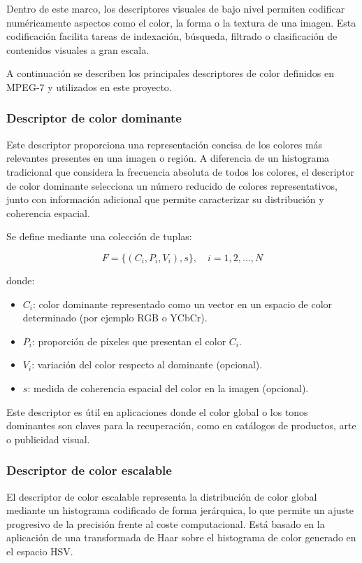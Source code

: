 Dentro de este marco, los descriptores visuales de bajo nivel permiten codificar numéricamente aspectos como el color, la forma o la textura de una imagen. Esta codificación facilita tareas de indexación, búsqueda, filtrado o clasificación de contenidos visuales a gran escala.

A continuación se describen los principales descriptores de color definidos en MPEG-7 y utilizados en este proyecto.

\subsubsection{Descriptor de color dominante}

Este descriptor proporciona una representación concisa de los colores más relevantes presentes en una imagen o región. A diferencia de un histograma tradicional que considera la frecuencia absoluta de todos los colores, el descriptor de color dominante selecciona un número reducido de colores representativos, junto con información adicional que permite caracterizar su distribución y coherencia espacial.

Se define mediante una colección de tuplas:

\[
F = \{ (C_i, P_i, V_i), s \}, \quad i = 1, 2, ..., N
\]

donde:
\begin{itemize}
    \item $C_i$: color dominante representado como un vector en un espacio de color determinado (por ejemplo RGB o YCbCr).
    \item $P_i$: proporción de píxeles que presentan el color $C_i$.
    \item $V_i$: variación del color respecto al dominante (opcional).
    \item $s$: medida de coherencia espacial del color en la imagen (opcional).
\end{itemize}

Este descriptor es útil en aplicaciones donde el color global o los tonos dominantes son claves para la recuperación, como en catálogos de productos, arte o publicidad visual.

\subsubsection{Descriptor de color escalable}

El descriptor de color escalable representa la distribución de color global mediante un histograma codificado de forma jerárquica, lo que permite un ajuste progresivo de la precisión frente al coste computacional. Está basado en la aplicación de una transformada de Haar sobre el histograma de color generado en el espacio HSV.

